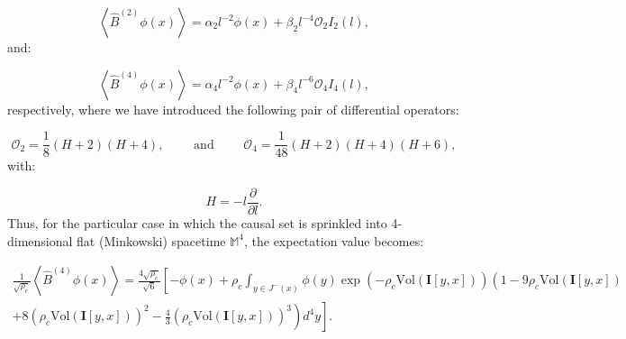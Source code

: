 \documentclass{article}
\begin{document}
\begin{equation}
\left\langle \hat{B}^{\left( 2 \right)} \phi \left( x \right) \right\rangle = \alpha_2 l^{-2} \phi \left( x \right) + \beta_2 l^{-4} \mathcal{O}_2 I_2 \left( l \right),
\end{equation}
and:

\begin{equation}
\left\langle \hat{B}^{\left( 4 \right)} \phi \left( x \right) \right\rangle = \alpha_4 l^{-2} \phi \left( x \right) + \beta_4 l^{-6} \mathcal{O}_4 I_4 \left( l \right),
\end{equation}
respectively, where we have introduced the following pair of differential operators:

\begin{equation}
\mathcal{O}_2 = \frac{1}{8} \left( H + 2 \right) \left( H + 4 \right), \qquad \text{ and } \qquad \mathcal{O}_4 = \frac{1}{48} \left( H + 2 \right) \left( H + 4 \right) \left( H + 6 \right),
\end{equation}
with:

\begin{equation}
H = -l \frac{\partial}{\partial l}.
\end{equation}
Thus, for the particular case in which the causal set is sprinkled into 4-dimensional flat (Minkowski) spacetime ${\mathbb{M}^4}$, the expectation value becomes:

\begin{multline}
\frac{1}{\sqrt{\rho_c}} \left\langle \hat{B}^{\left( 4 \right)} \phi \left( x \right) \right\rangle = \frac{4 \sqrt{\rho_c}}{\sqrt{6}} \left[ - \phi \left( x \right) + \rho_c \int_{y \in J^{-} \left( x \right)} \phi \left( y \right) \exp \left( - \rho_c \mathrm{Vol} \left( \mathbf{I} \left[ y, x \right] \right) \right) \left( 1 - 9 \rho_c \mathrm{Vol} \left( \mathbf{I} \left[ y, x \right] \right) \right. \right. \\
\left. \left. + 8 \left( \rho_c \mathrm{Vol} \left( \mathbf{I} \left[ y, x \right] \right) \right)^2 - \frac{4}{3} \left( \rho_c \mathrm{Vol} \left( \mathbf{I} \left[ y, x \right] \right) \right)^3 \right) d^4 y \right].
\end{multline}
\end{document}
